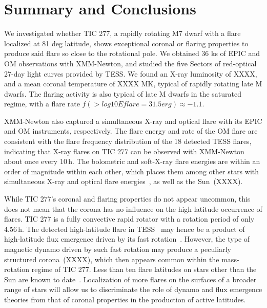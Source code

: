 \documentclass[twocolumn]{aastex631}
\begin{document}
\section{Summary and Conclusions}
We investigated whether TIC 277, a rapidly rotating M7 dwarf with a flare localized at 81 deg latitude, shows exceptional coronal or flaring properties to produce said flare so close to the rotational pole. We obtained 36 ks of EPIC and OM observations with XMM-Newton, and studied the five Sectors of red-optical 27-day light curves provided by TESS. We found an X-ray luminosity of XXXX, and a mean coronal temperature of XXXX MK, typical of rapidly rotating late M dwarfs. The flaring activity is also typical of late M dwarfs in the saturated regime, with a flare rate $f(> log 10 Eflare = 31.5 erg)\approx -1.1$. 

XMM-Newton also captured a simultaneous X-ray and optical flare with its EPIC and OM instruments, respectively. The flare energy and rate of the OM flare are consistent with the flare frequency distribution of the 18 detected TESS flares, indicating that X-ray flares on TIC 277 can be observed with XMM-Newton about once every $10\,$h. The bolometric and soft-X-ray flare energies are within an order of magnitude within each other, which places them among other stars with simultaneous X-ray and optical flare energies~\citep{guarcello2019simultaneous, kuznetsov2021stellar}, as well as the Sun~(XXXX).

While TIC 277's coronal and flaring properties do not appear uncommon, this does not mean that the corona has no influence on the high latitude occurrence of flares. TIC 277 is a fully convective rapid rotator with a rotation period of only $4.56\,$h. The detected high-latitude flare in TESS~\citep{ilin2021giant} may hence be a product of high-latitude flux emergence driven by its fast rotation~\citep{weber2016modeling,weber2017suppression}.
However, the type of magnetic dynamo driven by such fast rotation may produce a peculiarly structured corona~(XXXX), which then appears common within the mass-rotation regime of TIC 277. Less than ten flare latitudes on stars other than the Sun are known to date~\citep{wolter2008doppler, ilin2021giant, johnson2021simultaneous}. Localization of more flares on the surfaces of a broader range of stars will allow us to discriminate the role of dynamo and flux emergence theories from that of coronal properties in the production of active latitudes.
\end{document}
